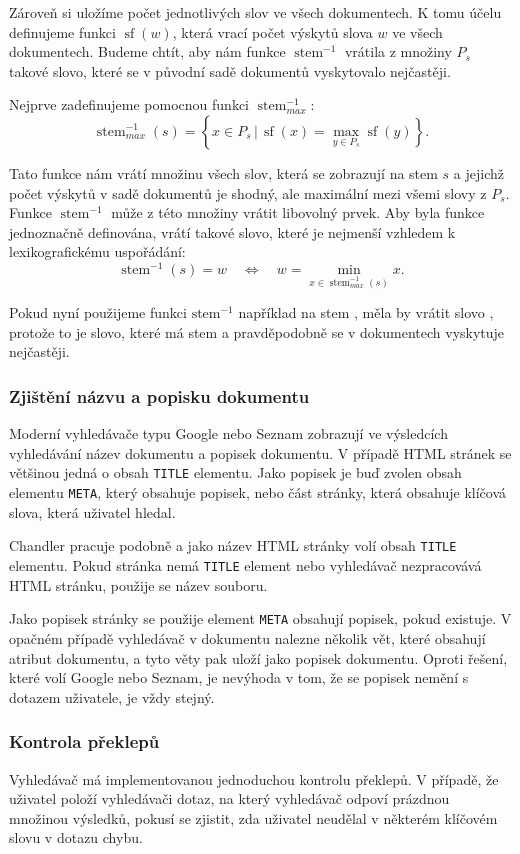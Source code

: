 \documentclass[12pt]{article}
\newcommand{\name}{Chandler}
\newcommand{\code}[1]{\texttt{#1}}
\newcommand{\sep}{\,|\,}
\newcommand{\sssection}[1]{\subsubsection{#1}}
\newcommand{\adds}[1]{\left\{#1\right\}}
\newcommand{\eq}{\Leftrightarrow}
\DeclareMathOperator{\stem}{stem}
\DeclareMathOperator{\wcount}{sf}
\newcommand{\invstem}{\stem^{-1}}
\begin{document}
Zároveň si uložíme počet jednotlivých slov ve všech dokumentech. K tomu účelu definujeme funkci $\wcount(w)$, která vrací počet výskytů slova $w$ ve všech dokumentech. Budeme chtít, aby nám funkce $\invstem$ vrátila z množiny $P_s$ takové slovo, které se v původní sadě dokumentů vyskytovalo nejčastěji. 

Nejprve zadefinujeme pomocnou funkci $\invstem_{max}$:
$$\invstem_{max}(s)=\adds{x\in P_s \sep \wcount(x) = \max_{y\in P_s}\wcount(y)}.$$

Tato funkce nám vrátí množinu všech slov, která se zobrazují na stem $s$ a jejichž počet výskytů v sadě dokumentů je shodný, ale maximální mezi všemi slovy z $P_s$. Funkce $\invstem$ může z této množiny vrátit libovolný prvek. Aby byla funkce jednoznačně definována, vrátí takové slovo, které je nejmenší vzhledem k lexikografickému uspořádání:
$$\invstem(s)=w\quad\eq\quad w=\min_{x\in \invstem_{max}(s)}x.$$

Pokud nyní použijeme funkci $\mbox{stem}^{-1}$ například na stem , měla by vrátit slovo , protože to je slovo, které má stem  a pravděpodobně se v dokumentech vyskytuje nejčastěji. 

\sssection{Zjištění názvu a popisku dokumentu}
Moderní vyhledávače typu Google nebo Seznam zobrazují ve výsledcích vyhledávání název dokumentu a popisek dokumentu. V případě HTML stránek se většinou jedná o obsah \code{TITLE} elementu. Jako popisek je buď zvolen obsah elementu \code{META}, který obsahuje popisek, nebo část stránky, která obsahuje klíčová slova, která uživatel hledal. 

\name{} pracuje podobně a jako název HTML stránky volí obsah \code{TITLE} elementu. Pokud stránka nemá \code{TITLE} element nebo vyhledávač nezpracovává HTML stránku, použije se název souboru. 

Jako popisek stránky se použije element \code{META} obsahují popisek, pokud existuje. V opačném případě vyhledávač v dokumentu nalezne několik vět, které obsahují atribut dokumentu, a tyto věty pak uloží jako popisek dokumentu. Oproti řešení, které volí Google nebo Seznam, je nevýhoda v tom, že se popisek nemění s dotazem uživatele, je vždy stejný. 

\sssection{Kontrola překlepů}
Vyhledávač má implementovanou jednoduchou kontrolu překlepů. V případě, že uživatel položí vyhledávači dotaz, na který vyhledávač odpoví prázdnou množinou výsledků, pokusí se zjistit, zda uživatel neudělal v některém klíčovém slovu v dotazu chybu. 
\end{document}
